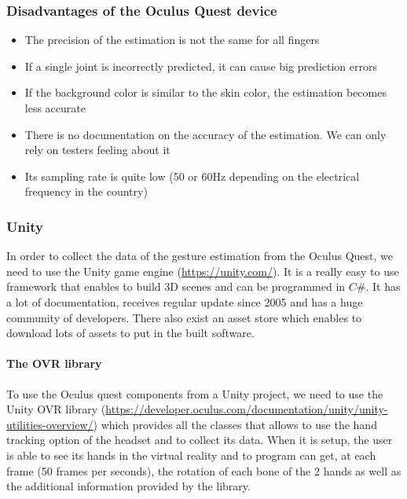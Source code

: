 \documentclass{article}
\begin{document}
\subsubsection{Disadvantages of the Oculus Quest device}
\begin{itemize}
    \item The precision of the estimation is not the same for all fingers
    \item If a single joint is incorrectly predicted, it can cause big prediction errors \cite{ref:oculus1}
    \item If the background color is similar to the skin color, the estimation becomes less accurate \cite{ref:oculus1}
    \item There is no documentation on the accuracy of the estimation. We can only rely on testers feeling about it \cite{ref:oculus3}
    \item Its sampling rate is quite low (50 or 60Hz depending on the electrical frequency in the country)
\end{itemize}


\subsubsection{Unity}

In order to collect the data of the gesture estimation from the Oculus Quest, we need to use the Unity game engine (\url{https://unity.com/}). It is a really easy to use framework that enables to build 3D scenes and can be programmed in $C\#$. It has a lot of documentation, receives regular update since 2005 and has a huge community of developers. There also exist an asset store which enables to download lots of assets to put in the built software.\cite{ref:oculus4}

\paragraph{The OVR library}

To use the Oculus quest components from a Unity project, we need to use the Unity OVR library (\url{https://developer.oculus.com/documentation/unity/unity-utilities-overview/}) which provides all the classes that allows to use the hand tracking option of the headset and to collect its data. When it is setup, the user is able to see its hands in the virtual reality and to program can get, at each frame (50 frames per seconds), the rotation of each bone of the 2 hands as well as the additional information provided by the library.
\end{document}
